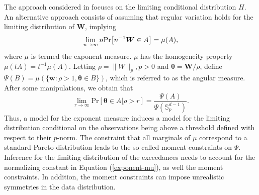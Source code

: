 The approach considered in \cite{rootzen2018} focuses on the limiting
    conditional distribution $H$. An alternative approach consists of assuming
    that regular variation \cite[see, for example,][]{resnick2008extreme} holds 
    for the limiting distribution of $\bm{W}$, implying
    \[
        \lim\limits_{n\rightarrow\infty} n \prob{n^{-1} \bm{W}\in A} = 
        \mu(A),
    \]
    where $\mu$ is termed the exponent measure. $\mu$ has the homogeneity property
    $\mu(tA) = t^{-1}\mu(A)$. Letting $\rho = \|W\|_p, p>0$ 
    and $\bm{\theta} = \bm{W}/\rho$, define  $\Psi(B) = \mu(\{\bm{w} : \rho>1, 
    \bm{\theta} \in B\})$, which is referred to as the angular measure. After 
    some manipulations, we obtain that
    \begin{equation}
    \label{exponent-mu}
        \lim\limits_{r\rightarrow\infty} 
        \text{Pr}\left[\bm{\theta}\in A \rvert \rho>r\right] = 
            \frac{\Psi(A)}{\Psi({\mathbb S}_p^{d-1})} .
    \end{equation}
    Thus, a model for the exponent measure induces a model for the limiting distribution
    conditional on the observations being above a threshold defined with respect
    to their $p$-norm. The constraint that all marginals of $\mu$ correspond to a
    standard Pareto distribution leads to the so called moment constraints on $\Psi$. 
    Inference for the limiting distribution of the exceedances
    needs to account for the normalizing constant in Equation (\ref{exponent-mu}), as well
    the moment constraints. In addition, the moment constraints can impose unrealistic
    symmetries in the data distribution.

